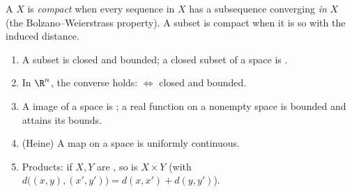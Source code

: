\begin{definition}\label{def:b2:metric:compact}
A  $X$ is \emph{compact}
when every sequence in $X$ has a subsequence converging \emph{in}
$X$ (the Bolzano--Weierstrass property). A subset is compact when it
is so with the induced distance.
\end{definition}

\begin{theorem}\label{thm:b2:metric:compactprops}
\begin{enumerate}
  \item A  subset is closed and bounded; a closed subset of a
         space is .
  \item In $\R^n$, the converse holds:  $\iff$ closed and
        bounded.
  \item A  image of a  space is ; a
         real function on a nonempty  space is
        bounded and attains its bounds.
  \item (Heine) A  map on a  space is uniformly
        continuous.
  \item Products: if $X, Y$ are , so is $X \times Y$ (with
        $d\bigl((x,y),(x',y')\bigr) = d(x,x') + d(y,y')$).
\end{enumerate}
\end{theorem}

